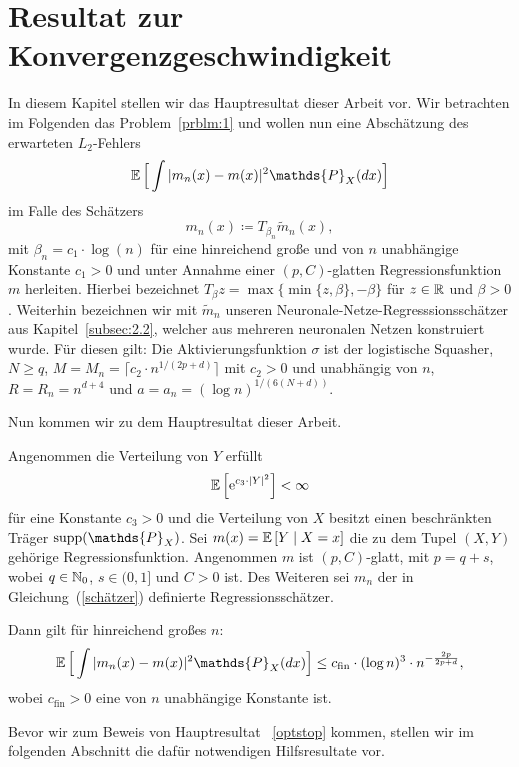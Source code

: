 \chapter{Resultat zur Konvergenzgeschwindigkeit}
\label{chap:3}

In diesem Kapitel stellen wir das Hauptresultat dieser Arbeit vor.
Wir betrachten im Folgenden das Problem~{\ref{prblm:1}} und wollen nun eine Abschätzung des erwarteten $L_2$-Fehlers 
$$\E \Big[\int |m_n(x) - m(x)|^2  \mathds{P}_X(dx)\Big]$$
im Falle des Schätzers 
\begin{equation}
\label{schätzer}
m_n(x) \coloneqq T_{\beta_n}\tilde{m}_n (x),
\end{equation}
mit $\beta_n = c_1 \cdot \log(n)$ für eine hinreichend große und von $n$ unabhängige Konstante $c_1 > 0$ und unter Annahme einer $(p,C)$-glatten Regressionsfunktion $m$ herleiten. Hierbei bezeichnet $T_{\beta}z = \max\{\min\{z, \beta\}, -\beta\}$
für $z \in \mathbb{R}$ und $\beta > 0$. Weiterhin bezeichnen wir mit $\tilde{m}_n$ unseren Neuronale-Netze-Regresssionsschätzer aus Kapitel~\ref{subsec:2.2}, welcher aus mehreren neuronalen Netzen konstruiert wurde. Für diesen gilt: 
Die Aktivierungsfunktion $\sigma$ ist der logistische Squasher, $N \geq q$, $M = M_n = \lceil c_2 \cdot n^{1/(2p + d)}\rceil$ mit $c_2 >0$ und unabhängig von $n$, $R = R_n = n^{d + 4}$ und $a = a_n = (\log n)^{1/(6(N + d))}.$

Nun kommen wir zu dem Hauptresultat dieser Arbeit.
\begin{mthm}
\label{optstop}
Angenommen die Verteilung von $Y$ erfüllt 
$$ \mathbb{E}\,\Big[\mathrm{e}^{c_3 \cdot |Y|^2}\Big] < \infty$$
für eine Konstante $c_3 > 0$ und die Verteilung von $X$ besitzt einen beschränkten Träger $\supp(\mathds{P}_X)$. Sei $m(x) = \mathbb{E}\,[Y \mid X = x]$ die zu dem Tupel $(X, Y)$ gehörige Regressionsfunktion.
Angenommen $m$ ist $(p,C)$-glatt, mit $p = q + s$, wobei $q \in \mathbb{N}_0$, $s \in (0,1]$ und $C > 0$ ist. Des Weiteren sei $m_n$ der in Gleichung~(\ref{schätzer}) definierte Regressionsschätzer.

Dann gilt für hinreichend großes $n$:
$$\E \Big[\int |m_n(x) - m(x)|^2  \mathds{P}_X(dx)\Big] \leq c_{\mathrm{fin}} \cdot (\log n)^3 \cdot n^{- \frac{2p}{2p + d}},$$
wobei $c_{\mathrm{fin}} > 0$ eine von $n$ unabhängige Konstante ist.
\end{mthm}

Bevor wir zum Beweis von Hauptresultat ~\ref{optstop} kommen, stellen wir im folgenden Abschnitt die dafür notwendigen Hilfsresultate vor.
